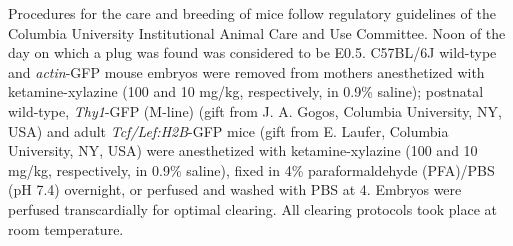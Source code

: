 Procedures for the care and breeding of mice follow regulatory guidelines of the Columbia University Institutional Animal Care and Use Committee.
Noon of the day on which a plug was found was considered to be E0.5.
C57BL/6J wild-type and \emph{actin}-GFP mouse embryos were removed from mothers anesthetized with ketamine-xylazine (100 and 10 mg/kg, respectively, in 0.9\% saline); postnatal wild-type, \emph{Thy1}-GFP (M-line) (gift from J. A. Gogos, Columbia University, NY, USA) and adult \emph{Tcf/Lef:H2B}-GFP mice (gift from E. Laufer, Columbia University, NY, USA) were anesthetized with ketamine-xylazine (100 and 10 mg/kg, respectively, in 0.9\% saline), fixed in 4\% paraformaldehyde (PFA)/PBS (pH 7.4) overnight, or perfused and washed with PBS at 4\textcelsius.
Embryos were perfused transcardially for optimal clearing.
All clearing protocols took place at room temperature.
